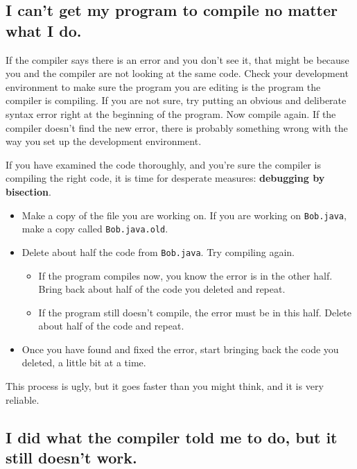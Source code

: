 \documentclass[12pt]{book}
\theoremstyle{definition}
\begin{document}
\subsection*{I can't get my program to compile no matter
what I do.}

If the compiler says there is an error and you don't see it, that
might be because you and the compiler are not looking at the same
code.  Check your development environment to make sure the program
you are editing is the program the compiler is compiling.  If you
are not sure, try putting an obvious and deliberate syntax error
right at the beginning of the program.  Now compile again.  If
the compiler doesn't find the new error, there is probably something
wrong with the way you set up the development environment.

If you have examined the code thoroughly, and you're sure the compiler
is compiling the right code, it is time for desperate measures:
{\bf debugging by bisection}.

\begin{itemize}

\item Make a copy of the file you are working on.  If you are
working on {\tt Bob.java}, make a copy called {\tt Bob.java.old}.

\item Delete about half the code from {\tt Bob.java}.  Try compiling
again.

\begin{itemize}

\item If the program compiles now, you know the error is in
the other half.  Bring back about half of the code you deleted and
repeat.

\item If the program still doesn't compile, the error must be in
this half.  Delete about half of the code and repeat.

\end{itemize}

\item Once you have found and fixed the error, start bringing back
the code you deleted, a little bit at a time.

\end{itemize}

This process is ugly, but it goes faster than you might think,
and it is very reliable.


\subsection*{I did what the compiler told me to do, but it
still doesn't work.}
\end{document}
